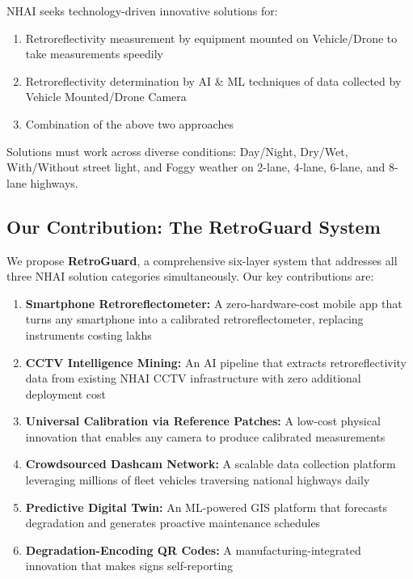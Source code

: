 \documentclass[11pt,a4paper]{article}
\begin{document}
NHAI seeks technology-driven innovative solutions for:

\begin{enumerate}[noitemsep]
    \item Retroreflectivity measurement by equipment mounted on Vehicle/Drone to take measurements speedily
    \item Retroreflectivity determination by AI \& ML techniques of data collected by Vehicle Mounted/Drone Camera
    \item Combination of the above two approaches
\end{enumerate}

Solutions must work across diverse conditions: Day/Night, Dry/Wet, With/Without street light, and Foggy weather on 2-lane, 4-lane, 6-lane, and 8-lane highways.

\subsection{Our Contribution: The RetroGuard System}

We propose \textbf{RetroGuard}, a comprehensive six-layer system that addresses all three NHAI solution categories simultaneously. Our key contributions are:

\begin{enumerate}[noitemsep]
    \item \textbf{Smartphone Retroreflectometer:} A zero-hardware-cost mobile app that turns any smartphone into a calibrated retroreflectometer, replacing instruments costing lakhs
    \item \textbf{CCTV Intelligence Mining:} An AI pipeline that extracts retroreflectivity data from existing NHAI CCTV infrastructure with zero additional deployment cost
    \item \textbf{Universal Calibration via Reference Patches:} A low-cost physical innovation that enables any camera to produce calibrated measurements
    \item \textbf{Crowdsourced Dashcam Network:} A scalable data collection platform leveraging millions of fleet vehicles traversing national highways daily
    \item \textbf{Predictive Digital Twin:} An ML-powered GIS platform that forecasts degradation and generates proactive maintenance schedules
    \item \textbf{Degradation-Encoding QR Codes:} A manufacturing-integrated innovation that makes signs self-reporting
\end{enumerate}
\end{document}
